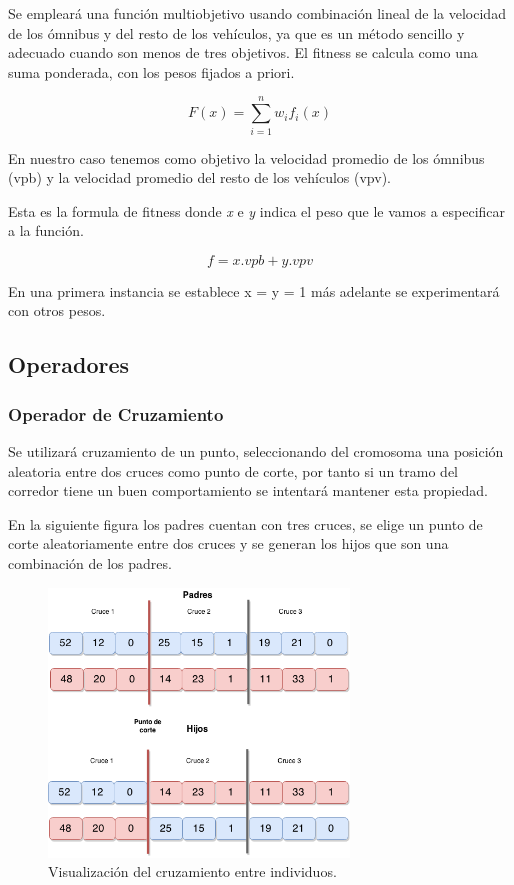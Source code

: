 Se empleará una función multiobjetivo usando combinación lineal de la velocidad de los ómnibus y del resto de los vehículos, ya que es un método sencillo y adecuado cuando son menos de tres objetivos. El fitness se calcula como una suma ponderada, con los pesos fijados a priori.

        \begin{equation}
        \label{eq:funcion_fitness_generica}
		F(x) = \sum_{i=1}^{n}{w_i}{f_i}(x)
        \end{equation}

En nuestro caso tenemos como objetivo la velocidad promedio de los ómnibus (vpb) y la velocidad promedio del resto de los vehículos (vpv).

Esta es la formula de fitness donde \emph{x} e \emph{y} indica el peso que le vamos a especificar a la función. 

        \begin{equation}
        \label{eq:funcion_fitness}
        f = x.vpb + y.vpv
        \end{equation}
        
En una primera instancia se establece x = y = 1 más adelante se experimentará con otros pesos.

\subsection{Operadores}
\subsubsection{Operador de Cruzamiento}
Se  utilizará cruzamiento de un punto, seleccionando del cromosoma una posición aleatoria entre dos cruces como punto de corte, por tanto si un tramo del corredor tiene un buen comportamiento se intentará mantener esta propiedad.

En la siguiente figura los padres cuentan con tres cruces, se elige un punto de corte aleatoriamente entre dos cruces y se generan los hijos que son una combinación de los padres.

\begin{figure}[H]
	\centering
	\includegraphics[width=8cm]{Figures/alg_cruzamiento}
	\caption{Visualización del cruzamiento entre individuos.}
	\label{fig:op_cruzamiento}
\end{figure}


